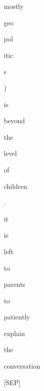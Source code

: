 \documentclass[varwidth=150mm]{standalone}
\begin{document}
\begin{CJK*}{UTF8}{gbsn}
{{{\colorbox{red!3.3570826053619385}{\strut mostly} \colorbox{red!0.0}{\strut geo}\colorbox{red!1.2916357517242432}{\strut pol}\colorbox{red!2.371098041534424}{\strut itic}\colorbox{red!2.807572364807129}{\strut s} \colorbox{red!0.0}{\strut )} \colorbox{red!1.9219661951065063}{\strut is} \colorbox{red!0.0}{\strut beyond} \colorbox{red!0.0}{\strut the} \colorbox{red!5.2677001953125}{\strut level} \colorbox{red!2.356464385986328}{\strut of} \colorbox{red!2.459071397781372}{\strut children} \colorbox{red!0.0}{\strut .} \colorbox{red!3.6682584285736084}{\strut it} \colorbox{red!4.9686479568481445}{\strut is} \colorbox{red!4.934638023376465}{\strut left} \colorbox{red!0.0}{\strut to} \colorbox{red!22.219518661499023}{\strut parents} \colorbox{red!7.005324840545654}{\strut to} \colorbox{red!4.117661952972412}{\strut patiently} \colorbox{red!1.6398286819458008}{\strut explain} \colorbox{red!8.880485534667969}{\strut the} \colorbox{red!3.639986515045166}{\strut conversation} \colorbox{red!3.360302448272705}{\strut [SEP]}
}}}
\end{CJK*}
\end{document}
